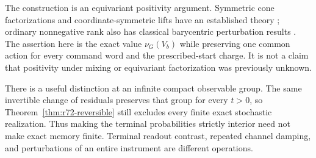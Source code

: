 The construction is an equivariant positivity argument. Symmetric cone
factorizations and coordinate-symmetric lifts have an established theory
\cite{GPT13,KPT10}; ordinary nonnegative rank also has classical barycentric
perturbation results \cite{BocciCarliniRapallo11}. The assertion here is the
exact value $\nu_G(V_b)$ while preserving one common action for every command
word and the prescribed-start charge. It is not a claim that positivity
under mixing or equivariant factorization was previously unknown.

There is a useful distinction at an infinite compact observable group.
The same invertible change of residuals preserves that group for every
$t>0$, so Theorem~\ref{thm:r72-reversible} still excludes every finite
exact stochastic realization. Thus making the terminal probabilities
strictly interior need not make exact memory finite. Terminal readout
contrast, repeated channel damping, and perturbations of an entire
instrument are different operations.

